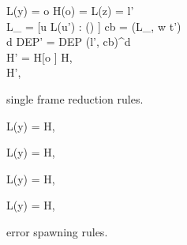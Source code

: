 \begin{figure}
  {L(y) = o \andalso H(o) =  \andalso L(z) = l' \\
  L_{} = [u \mapsto L(u') : () \in {}]
  \andalso cb = (L_{}, w \Rightarrow t') \\
  d \andalso DEP' = DEP \cup (l', cb)^d \\
  H' = H[o \mapsto {}] }
  { H,  \\ \FRedTo \;
  H',  }
  \caption{\RACL{} single frame reduction rules.}
  \label{fig:frame_red_rules}
\end{figure}

\begin{figure}
  {L(y) = \NullVal}
  {H,  \; \FRedTo \; \Error}

  \RuleSpace{}

  {L(y) = \NullVal}
  {H,  \; \FRedTo \; \Error}

  \RuleSpace{}

  {L(y) = \NullVal}
  {H,  \; \FRedTo \; \Error}

  \RuleSpace{}

  {L(y) = \NullVal}
  {H,   \\ \FRedTo \; \Error}
  \caption{\RACL{} error spawning rules.}
  \label{fig:error_red_rules}
\end{figure}

